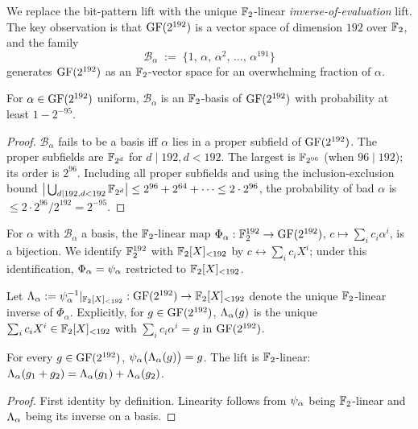 We replace the bit-pattern lift with the unique $\mathbb{F}_2$-linear
\emph{inverse-of-evaluation} lift. The key observation is that
$\mathrm{GF}(2^{192})$ is a vector space of dimension $192$ over $\mathbb{F}_2$, and the
family
\[
  \mathcal{B}_\alpha \;:=\; \big\{1,\,\alpha,\,\alpha^2,\,\ldots,\,\alpha^{191}\big\}
\]
generates $\mathrm{GF}(2^{192})$ as an $\mathbb{F}_2$-vector space for an overwhelming
fraction of $\alpha$.

\begin{lemma}
\label{lem:generic-basis}
For $\alpha \in \mathrm{GF}(2^{192})$ uniform, $\mathcal{B}_\alpha$ is an
$\mathbb{F}_2$-basis of $\mathrm{GF}(2^{192})$ with probability at least
$1 - 2^{-95}$.
\end{lemma}

\begin{proof}
$\mathcal{B}_\alpha$ fails to be a basis iff $\alpha$ lies in a
proper subfield of $\mathrm{GF}(2^{192})$. The proper subfields are
$\mathbb{F}_{2^d}$ for $d \mid 192, d < 192$. The largest is $\mathbb{F}_{2^{96}}$
(when $96 \mid 192$); its order is $2^{96}$. Including all proper
subfields and using the inclusion-exclusion bound
$\big|\bigcup_{d \mid 192, d < 192} \mathbb{F}_{2^d}\big| \le 2^{96} + 2^{64}
+ \cdots \le 2 \cdot 2^{96}$, the probability of bad $\alpha$ is
$\le 2 \cdot 2^{96} / 2^{192} = 2^{-95}$.
\end{proof}

For $\alpha$ with $\mathcal{B}_\alpha$ a basis, the $\mathbb{F}_2$-linear map
$\Phi_\alpha : \mathbb{F}_2^{192} \to \mathrm{GF}(2^{192})$, $c \mapsto \sum_{i} c_i \alpha^i$,
is a bijection. We identify $\mathbb{F}_2^{192}$ with $\mathbb{F}_2[X]_{<192}$ by
$c \leftrightarrow \sum_i c_i X^i$; under this identification,
$\Phi_\alpha = \psi_{\alpha}$ restricted to $\mathbb{F}_2[X]_{<192}$.

\begin{definition}
\label{def:invlift}
Let $\Lambda_{\alpha} := \psi_{\alpha}^{-1}|_{\mathbb{F}_2[X]_{<192}} : \mathrm{GF}(2^{192}) \to \mathbb{F}_2[X]_{<192}$
denote the unique $\mathbb{F}_2$-linear inverse of $\Phi_\alpha$. Explicitly,
for $g \in \mathrm{GF}(2^{192})$, $\Lambda_{\alpha}(g)$ is the unique
$\sum_i c_i X^i \in \mathbb{F}_2[X]_{<192}$ with
$\sum_i c_i \alpha^i = g$ in $\mathrm{GF}(2^{192})$.
\end{definition}

\begin{proposition}
\label{prop:lift-roundtrip}
For every $g \in \mathrm{GF}(2^{192})$,
$\psi_{\alpha}\big(\Lambda_{\alpha}(g)\big) = g$. The lift is $\mathbb{F}_2$-linear:
$\Lambda_{\alpha}(g_1 + g_2) = \Lambda_{\alpha}(g_1) + \Lambda_{\alpha}(g_2)$.
\end{proposition}

\begin{proof}
First identity by definition. Linearity follows from
$\psi_{\alpha}$ being $\mathbb{F}_2$-linear and $\Lambda_{\alpha}$ being its inverse on a
basis.
\end{proof}


